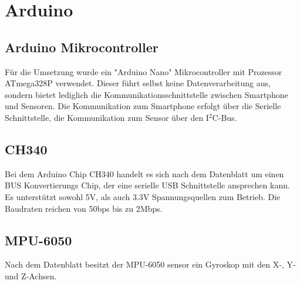 \section{Arduino}

\subsection*{Arduino Mikrocontroller}
Für die Umsetzung wurde ein "Arduino Nano" Mikrocontroller mit Prozessor ATmega328P verwendet. Dieser führt selbst keine Datenverarbeitung aus, sondern bietet lediglich die Kommunikationsschnittstelle zwischen Smartphone und Sensoren. Die Kommunikation zum Smartphone erfolgt über die Serielle Schnittstelle, die Kommunikation zum Sensor über den I$^2$C-Bus. 


\subsection*{CH340}
Bei dem Arduino Chip CH340 handelt es sich nach dem Datenblatt \cite{CH340} um einen BUS Konvertierungs Chip, der eine serielle USB Schnittstelle ansprechen kann.
Es unterstützt sowohl 5V, als auch 3.3V Spannungsquellen zum Betrieb.
Die Baudraten reichen von 50bps bis zu 2Mbps.


\subsection*{MPU-6050}
Nach dem Datenblatt \cite{MPU6050} besitzt der MPU-6050 sensor ein Gyroskop mit den X-, Y- und Z-Achsen.
